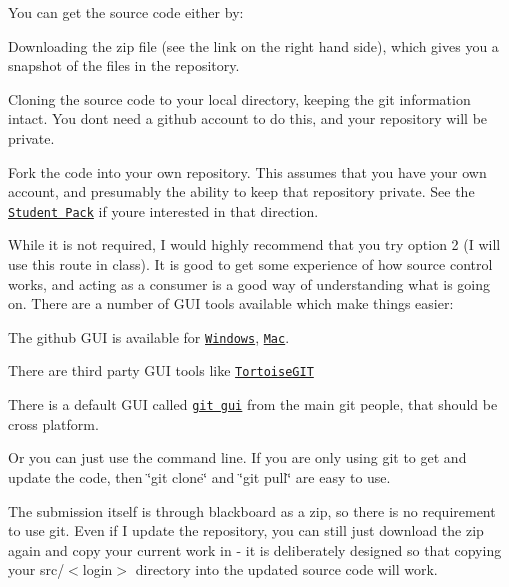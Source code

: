 You can get the source code either by\+:


\begin{DoxyEnumerate}
\item Downloading the zip file (see the link on the right hand side), which gives you a snapshot of the files in the repository.
\item Cloning the source code to your local directory, keeping the git information intact. You don\textquotesingle{}t need a github account to do this, and your repository will be private.
\item Fork the code into your own repository. This assumes that you have your own account, and presumably the ability to keep that repository private. See the \href{https://education.github.com/pack}{\tt Student Pack} if you\textquotesingle{}re interested in that direction.
\end{DoxyEnumerate}

While it is not required, I would highly recommend that you try option 2 (I will use this route in class). It is good to get some experience of how source control works, and acting as a consumer is a good way of understanding what is going on. There are a number of G\+U\+I tools available which make things easier\+:


\begin{DoxyItemize}
\item The github G\+U\+I is available for \href{https://windows.github.com/}{\tt Windows}, \href{https://mac.github.com/}{\tt Mac}.
\item There are third party G\+U\+I tools like \href{https://code.google.com/p/tortoisegit/}{\tt Tortoise\+G\+I\+T}
\item There is a default G\+U\+I called \href{https://www.kernel.org/pub/software/scm/git/docs/git-gui.html}{\tt git gui} from the main git people, that should be cross platform.
\item Or you can just use the command line. If you are only using git to get and update the code, then \char`\"{}git clone\char`\"{} and \char`\"{}git pull\char`\"{} are easy to use.
\end{DoxyItemize}

The submission itself is through blackboard as a zip, so there is no requirement to use git. Even if I update the repository, you can still just download the zip again and copy your current work in -\/ it is deliberately designed so that copying your {\ttfamily src/$<$login$>$} directory into the updated source code will work.

